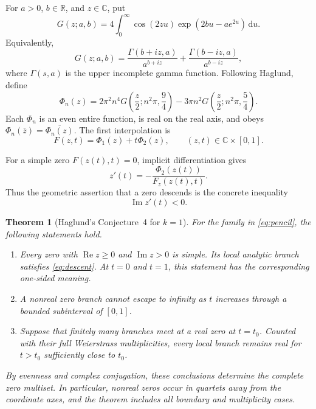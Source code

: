 \documentclass[11pt,a4paper]{amsart}
\newtheorem{theorem}{Theorem}[section]
\theoremstyle{definition}
\theoremstyle{remark}
\newcommand{\C}{\mathbb C}
\newcommand{\R}{\mathbb R}
\newcommand{\PhiOne}{\Phi_{1}}
\newcommand{\PhiTwo}{\Phi_{2}}
\newcommand{\dd}{\,\mathrm d}
\begin{document}
For $a>0$, $b\in\R$, and $z\in\C$, put
\begin{equation}\label{eq:G-def}
 G(z;a,b)=4\int_{0}^{\infty}\cos(2zu)\exp\!\left(2bu-ae^{2u}\right)\dd u.
\end{equation}
Equivalently,
\begin{equation}\label{eq:G-gamma}
 G(z;a,b)
 =\frac{\Gamma(b+iz,a)}{a^{b+iz}}
  +\frac{\Gamma(b-iz,a)}{a^{b-iz}},
\end{equation}
where $\Gamma(s,a)$ is the upper incomplete gamma function.  Following Haglund, define
\begin{equation}\label{eq:Phi-def}
 \Phi_n(z)=2\pi^2n^4G\!\left(\frac z2;n^2\pi,\frac94\right)
 -3\pi n^2G\!\left(\frac z2;n^2\pi,\frac54\right).
\end{equation}
Each $\Phi_n$ is an even entire function, is real on the real axis, and obeys
$\Phi_n(\overline z)=\overline{\Phi_n(z)}$.  The first interpolation is
\begin{equation}\label{eq:pencil}
 F(z,t)=\PhiOne(z)+t\PhiTwo(z),\qquad (z,t)\in\C\times[0,1].
\end{equation}

For a simple zero $F(z(t),t)=0$, implicit differentiation gives
\begin{equation}\label{eq:velocity}
 z'(t)=-\frac{\PhiTwo(z(t))}{F_z(z(t),t)}.
\end{equation}
Thus the geometric assertion that a zero descends is the concrete inequality
\begin{equation}\label{eq:descent}
 \operatorname{Im}z'(t)<0.
\end{equation}

\begin{theorem}[Haglund's Conjecture~4 for $k=1$]\label{thm:main}
For the family in \eqref{eq:pencil}, the following statements hold.
\begin{enumerate}[label=\textup{(\roman*)}]
  \item Every zero with $\operatorname{Re}z\geq0$ and $\operatorname{Im}z>0$ is simple.  Its local analytic branch satisfies \eqref{eq:descent}.  At $t=0$ and $t=1$, this statement has the corresponding one-sided meaning.
  \item A nonreal zero branch cannot escape to infinity as $t$ increases through a bounded subinterval of $[0,1]$.
  \item Suppose that finitely many branches meet at a real zero at $t=t_0$.  Counted with their full Weierstrass multiplicities, every local branch remains real for $t>t_0$ sufficiently close to $t_0$.
\end{enumerate}
By evenness and complex conjugation, these conclusions determine the complete zero multiset.  In particular, nonreal zeros occur in quartets away from the coordinate axes, and the theorem includes all boundary and multiplicity cases.
\end{theorem}
\end{document}
